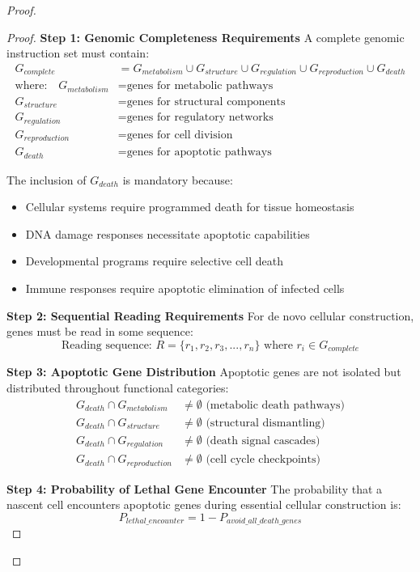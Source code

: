 \documentclass[12pt,a4paper]{article}
\begin{document}
\begin{proof}
\begin{proof}
\textbf{Step 1: Genomic Completeness Requirements}
A complete genomic instruction set must contain:
\begin{align}
G_{complete} &= G_{metabolism} \cup G_{structure} \cup G_{regulation} \cup G_{reproduction} \cup G_{death} \\
\text{where:} \quad G_{metabolism} &= \text{genes for metabolic pathways} \\
G_{structure} &= \text{genes for structural components} \\
G_{regulation} &= \text{genes for regulatory networks} \\
G_{reproduction} &= \text{genes for cell division} \\
G_{death} &= \text{genes for apoptotic pathways}
\end{align}

The inclusion of $G_{death}$ is mandatory because:
\begin{itemize}
\item Cellular systems require programmed death for tissue homeostasis
\item DNA damage responses necessitate apoptotic capabilities
\item Developmental programs require selective cell death
\item Immune responses require apoptotic elimination of infected cells
\end{itemize}

\textbf{Step 2: Sequential Reading Requirements}
For de novo cellular construction, genes must be read in some sequence:
\begin{equation}
\text{Reading sequence: } R = \{r_1, r_2, r_3, ..., r_n\} \text{ where } r_i \in G_{complete}
\end{equation}

\textbf{Step 3: Apoptotic Gene Distribution}
Apoptotic genes are not isolated but distributed throughout functional categories:
\begin{align}
G_{death} \cap G_{metabolism} &\neq \emptyset \text{ (metabolic death pathways)} \\
G_{death} \cap G_{structure} &\neq \emptyset \text{ (structural dismantling)} \\
G_{death} \cap G_{regulation} &\neq \emptyset \text{ (death signal cascades)} \\
G_{death} \cap G_{reproduction} &\neq \emptyset \text{ (cell cycle checkpoints)}
\end{align}

\textbf{Step 4: Probability of Lethal Gene Encounter}
The probability that a nascent cell encounters apoptotic genes during essential cellular construction is:
\begin{equation}
P_{lethal\_encounter} = 1 - P_{avoid\_all\_death\_genes}
\end{equation}


\end{proof}
\end{proof}
\end{document}
